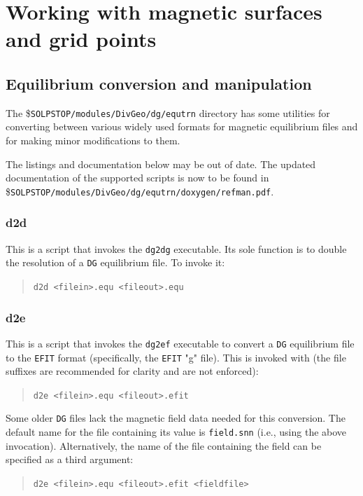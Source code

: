 \documentclass[a4paper,10pt]{report}
\begin{document}
\section{Working with magnetic surfaces and grid points}

\subsection{Equilibrium conversion and manipulation}
\label{sec:equtrn}

The \${\tt SOLPSTOP/modules/DivGeo/dg/equtrn}
directory has some utilities for converting between various
widely used formats for magnetic equilibrium files and for making minor
modifications to them.

The listings and documentation below may be out of date. The updated
documentation of the supported scripts is now to be found in
\${\tt SOLPSTOP/modules/DivGeo/dg/equtrn/doxygen/refman.pdf}.

\subsubsection{d2d}

This is a script that invokes the {\tt dg2dg} executable.  Its sole
function is to double the resolution of a {\tt DG} equilibrium file.  To
invoke it:
\begin{quote}
{\tt d2d <filein>.equ <fileout>.equ}
\end{quote}

\subsubsection{d2e}

This is a script that invokes the {\tt dg2ef}
executable to convert a
{\tt DG} equilibrium file to the {\tt EFIT} format (specifically, the {\tt EFIT} "g" file).
This is invoked with (the file suffixes are recommended for clarity
and are not enforced):
\begin{quote}
{\tt d2e <filein>.equ <fileout>.efit}
\end{quote}

Some older {\tt DG} files lack the magnetic field data needed for this conversion.
The default name for the file containing its value is
{\tt field.snn} (i.e., using the above invocation).
Alternatively, the name of the file containing the field can be
specified as a third argument:
\begin{quote}
{\tt d2e <filein>.equ <fileout>.efit <fieldfile>}
\end{quote}
\end{document}
